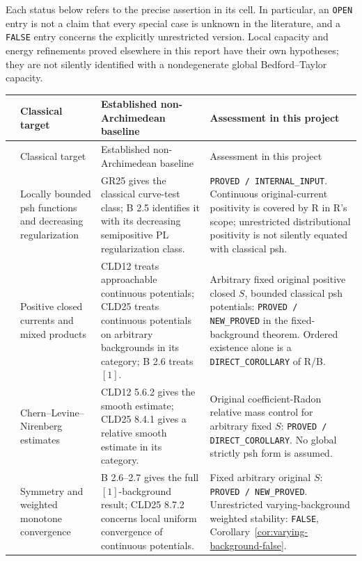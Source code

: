 \documentclass[11pt,a4paper]{article}
\numberwithin{equation}{section}
\theoremstyle{definition}
\theoremstyle{remark}
\begin{document}
Each status below refers to the precise assertion in its cell. In particular,
an \texttt{OPEN} entry is not a claim that every special case is unknown in
the literature, and a \texttt{FALSE} entry concerns the explicitly unrestricted
version. Local capacity and energy refinements proved elsewhere in this
report have their own hypotheses; they are not silently identified with a
nondegenerate global Bedford--Taylor capacity.

\begin{longtable}{@{}>{\raggedright\arraybackslash}p{}>{\raggedright\arraybackslash}p{}>{\raggedright\arraybackslash}p{}>{\raggedright\arraybackslash}p{}@{}}
\hline
 & Classical target & Established non-Archimedean baseline & Assessment in this project\\
\hline
\endfirsthead
\hline
 & Classical target & Established non-Archimedean baseline & Assessment in this project\\
\hline
\endhead
1 & Locally bounded psh functions and decreasing regularization &
GR25 gives the classical curve-test class; B 2.5 identifies it with its
decreasing semipositive PL regularization class. &
\texttt{PROVED / INTERNAL\_INPUT}. Continuous original-current positivity
is covered by R in R's scope; unrestricted distributional positivity is not
silently equated with classical psh.\\[3pt]
2 & Positive closed currents and mixed products &
CLD12 treats approachable continuous potentials; CLD25 treats continuous
potentials on arbitrary backgrounds in its category; B 2.6 treats \([1]\). &
Arbitrary fixed original positive closed \(S\), bounded classical psh
potentials: \texttt{PROVED / NEW\_PROVED} in the fixed-background theorem.
Ordered existence alone is a \texttt{DIRECT\_COROLLARY} of R/B.\\[3pt]
3 & Chern--Levine--Nirenberg estimates &
CLD12 5.6.2 gives the smooth estimate; CLD25 8.4.1 gives a relative smooth
estimate in its category. &
Original coefficient-Radon relative mass control for arbitrary fixed
\(S\): \texttt{PROVED / DIRECT\_COROLLARY}. No global strictly psh form is assumed.\\[3pt]
4 & Symmetry and weighted monotone convergence &
B 2.6--2.7 gives the full \([1]\)-background result; CLD25 8.7.2 concerns
local uniform convergence of continuous potentials. &
Fixed arbitrary original \(S\): \texttt{PROVED / NEW\_PROVED}.
Unrestricted varying-background weighted stability:
\texttt{FALSE}, Corollary~\ref{cor:varying-background-false}.\\[3pt]

\end{longtable}
\end{document}
